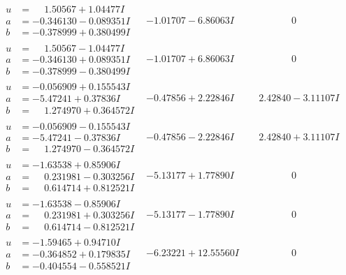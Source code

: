 \documentclass[1p]{elsarticle_modified}
\theoremstyle{definition}
\begin{document}
$$\begin{array}{c|c|c}
\begin{aligned}
u &= \phantom{-}1.50567 + 1.04477 I \\
a &= -0.346130 - 0.089351 I \\
b &= -0.378999 + 0.380499 I\end{aligned}
 & -1.01707 - 6.86063 I & \phantom{-0.000000 } 0 \\ \hline\begin{aligned}
u &= \phantom{-}1.50567 - 1.04477 I \\
a &= -0.346130 + 0.089351 I \\
b &= -0.378999 - 0.380499 I\end{aligned}
 & -1.01707 + 6.86063 I & \phantom{-0.000000 } 0 \\ \hline\begin{aligned}
u &= -0.056909 + 0.155543 I \\
a &= -5.47241 + 0.37836 I \\
b &= \phantom{-}1.274970 + 0.364572 I\end{aligned}
 & -0.47856 + 2.22846 I & \phantom{-}2.42840 - 3.11107 I \\ \hline\begin{aligned}
u &= -0.056909 - 0.155543 I \\
a &= -5.47241 - 0.37836 I \\
b &= \phantom{-}1.274970 - 0.364572 I\end{aligned}
 & -0.47856 - 2.22846 I & \phantom{-}2.42840 + 3.11107 I \\ \hline\begin{aligned}
u &= -1.63538 + 0.85906 I \\
a &= \phantom{-}0.231981 - 0.303256 I \\
b &= \phantom{-}0.614714 + 0.812521 I\end{aligned}
 & -5.13177 + 1.77890 I & \phantom{-0.000000 } 0 \\ \hline\begin{aligned}
u &= -1.63538 - 0.85906 I \\
a &= \phantom{-}0.231981 + 0.303256 I \\
b &= \phantom{-}0.614714 - 0.812521 I\end{aligned}
 & -5.13177 - 1.77890 I & \phantom{-0.000000 } 0 \\ \hline\begin{aligned}
u &= -1.59465 + 0.94710 I \\
a &= -0.364852 + 0.179835 I \\
b &= -0.404554 - 0.558521 I\end{aligned}
 & -6.23221 + 12.55560 I & \phantom{-0.000000 } 0\\

\end{array}$$
\end{document}
